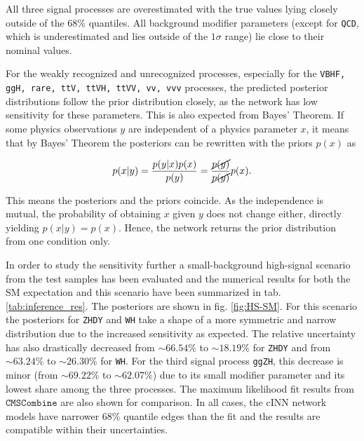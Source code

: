 All three signal processes are overestimated with the true values lying closely outside of the 68\% quantiles. All background modifier parameters (except for \texttt{QCD}, which is underestimated and lies outside of the $1\sigma$ range) lie close to their nominal values.

For the weakly recognized and unrecognized processes, especially for the \texttt{VBHF, ggH, rare, ttV, ttVH, ttVV, vv, vvv} processes, the predicted posterior distributions follow the prior distribution closely, as the network has low sensitivity for these parameters. This is also expected from Bayes' Theorem. If some physics observations $y$ are independent of a physics parameter $x$, it means that by Bayes' Theorem the posteriors can be rewritten with the priors $p(x)$ as

\begin{equation*}
	p(x|y) = \frac{p(y|x)p(x)}{p(y)} = \frac{\cancel{p(y)}}{\cancel{p(y)}} p(x).
\end{equation*}

This means the posteriors and the priors coincide. As the independence is mutual, the probability of obtaining $x$ given $y$ does not change either, directly yielding $p(x|y) = p(x)$. Hence, the network returns the prior distribution from one condition only.

In order to study the sensitivity further a small-background high-signal scenario from the test samples has been evaluated and the numerical results for both the SM expectation and this scenario have been summarized in tab. \ref{tab:inference_res}. The posteriors are shown in fig. \ref{fig:HS-SM}. For this scenario the posteriors for \texttt{ZHDY} and \texttt{WH} take a shape of a more symmetric and narrow distribution due to the increased sensitivity as expected. The relative uncertainty has also drastically decreased from $\sim66.54\%$ to $\sim18.19\%$ for \texttt{ZHDY} and from $\sim63.24\%$ to $\sim26.30\%$ for \texttt{WH}. For the third signal process \texttt{ggZH}, this decrease is minor (from $\sim69.22\%$ to $\sim 62.07\%$) due to its small modifier parameter and its lowest share among the three processes. The maximum likelihood fit results from $\texttt{CMSCombine}$ are also shown for comparison. In all cases, the cINN network models have narrower 68\% quantile edges than the fit and the results are compatible within their uncertainties. 

